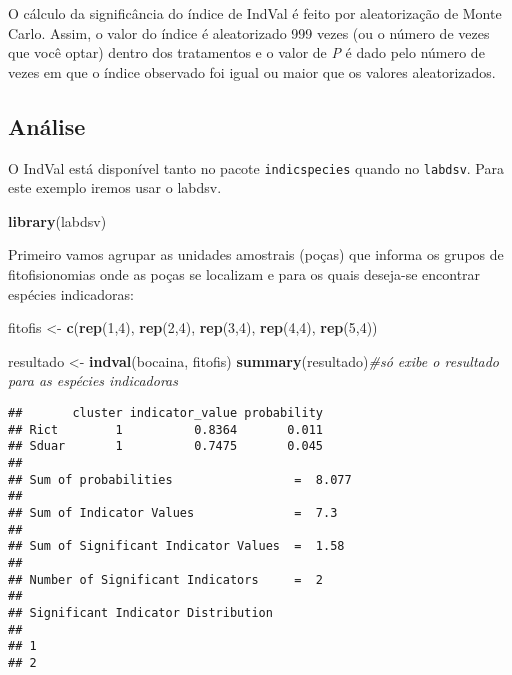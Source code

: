 \documentclass[
]{book}
\newenvironment{Shaded}{\begin{snugshade}}{\end{snugshade}}
\newcommand{\CommentTok}[1]{\textcolor[rgb]{0.56,0.35,0.01}{\textit{#1}}}
\newcommand{\DecValTok}[1]{\textcolor[rgb]{0.00,0.00,0.81}{#1}}
\newcommand{\KeywordTok}[1]{\textcolor[rgb]{0.13,0.29,0.53}{\textbf{#1}}}
\newcommand{\NormalTok}[1]{#1}
\newcommand{\StringTok}[1]{\textcolor[rgb]{0.31,0.60,0.02}{#1}}
\begin{document}
O cálculo da significância do índice de IndVal é feito por aleatorização de Monte Carlo. Assim, o valor do índice é aleatorizado 999 vezes (ou o número de vezes que você optar) dentro dos tratamentos e o valor de \emph{P} é dado pelo número de vezes em que o índice observado foi igual ou maior que os valores aleatorizados.

\hypertarget{anuxe1lise-2}{%
\subsection{Análise}\label{anuxe1lise-2}}

O IndVal está disponível tanto no pacote \texttt{indicspecies} quando no \texttt{labdsv}. Para este exemplo iremos usar o labdsv.

\begin{Shaded}
\begin{Highlighting}[]
\KeywordTok{library}\NormalTok{(labdsv)}
\end{Highlighting}
\end{Shaded}

Primeiro vamos agrupar as unidades amostrais (poças) que informa os grupos de fitofisionomias onde as poças se localizam e para os quais deseja-se encontrar espécies indicadoras:

\begin{Shaded}
\begin{Highlighting}[]
\NormalTok{fitofis <-}\StringTok{ }\KeywordTok{c}\NormalTok{(}\KeywordTok{rep}\NormalTok{(}\DecValTok{1}\NormalTok{,}\DecValTok{4}\NormalTok{), }\KeywordTok{rep}\NormalTok{(}\DecValTok{2}\NormalTok{,}\DecValTok{4}\NormalTok{), }\KeywordTok{rep}\NormalTok{(}\DecValTok{3}\NormalTok{,}\DecValTok{4}\NormalTok{), }\KeywordTok{rep}\NormalTok{(}\DecValTok{4}\NormalTok{,}\DecValTok{4}\NormalTok{), }\KeywordTok{rep}\NormalTok{(}\DecValTok{5}\NormalTok{,}\DecValTok{4}\NormalTok{))}
\end{Highlighting}
\end{Shaded}

\begin{Shaded}
\begin{Highlighting}[]
\NormalTok{resultado <-}\StringTok{ }\KeywordTok{indval}\NormalTok{(bocaina, fitofis)}
\KeywordTok{summary}\NormalTok{(resultado)}\CommentTok{#só exibe o resultado para as espécies indicadoras}
\end{Highlighting}
\end{Shaded}

\begin{verbatim}
##       cluster indicator_value probability
## Rict        1          0.8364       0.011
## Sduar       1          0.7475       0.045
## 
## Sum of probabilities                 =  8.077 
## 
## Sum of Indicator Values              =  7.3 
## 
## Sum of Significant Indicator Values  =  1.58 
## 
## Number of Significant Indicators     =  2 
## 
## Significant Indicator Distribution
## 
## 1 
## 2
\end{verbatim}
\end{document}
